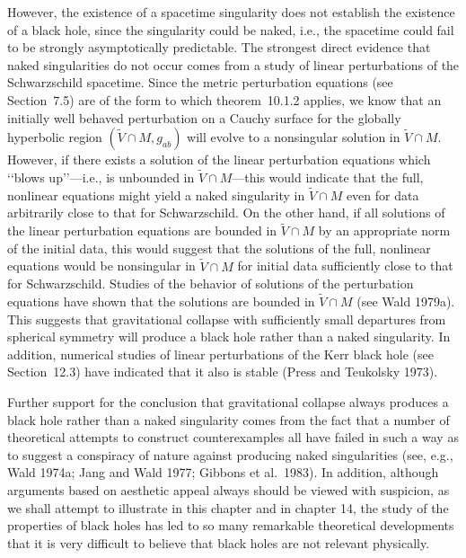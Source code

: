 However, the existence of a spacetime singularity does not establish the existence of
a black hole, since the singularity could be naked, i.e., the spacetime could fail to be
strongly asymptotically predictable. The strongest direct evidence that naked
singularities do not occur comes from a study of linear perturbations of the
Schwarzschild spacetime. Since the metric perturbation equations (see Section~7.5)
are of the form to which theorem~10.1.2 applies, we know that an initially well
behaved perturbation on a Cauchy surface for the globally hyperbolic region
\((\widetilde V\cap M,g_{ab})\) will evolve to a nonsingular solution in
\(\widetilde V\cap M\). However, if there exists a solution of the linear perturbation
equations which \lq\lq blows up\rq\rq---i.e., is unbounded in \(\widetilde V\cap M\)---this
would indicate that the full, nonlinear equations might yield a naked singularity in
\(\widetilde V\cap M\) even for data arbitrarily close to that for Schwarzschild. On
the other hand, if all solutions of the linear perturbation equations are bounded in
\(\widetilde V\cap M\) by an appropriate norm of the initial data, this would suggest
that the solutions of the full, nonlinear equations would be nonsingular in
\(\widetilde V\cap M\) for initial data sufficiently close to that for Schwarzschild.
Studies of the behavior of solutions of the perturbation equations have shown that
the solutions are bounded in \(\widetilde V\cap M\) (see Wald 1979a). This suggests
that gravitational collapse with sufficiently small departures from spherical symmetry
will produce a black hole rather than a naked singularity. In addition, numerical
studies of linear perturbations of the Kerr black hole (see Section~12.3) have
indicated that it also is stable (Press and Teukolsky 1973).

Further support for the conclusion that gravitational collapse always produces a black
hole rather than a naked singularity comes from the fact that a number of theoretical
attempts to construct counterexamples all have failed in such a way as to suggest a
conspiracy of nature against producing naked singularities (see, e.g., Wald 1974a;
Jang and Wald 1977; Gibbons et al.\ 1983). In addition, although arguments based
on aesthetic appeal always should be viewed with suspicion, as we shall attempt to
illustrate in this chapter and in chapter 14, the study of the properties of black holes
has led to so many remarkable theoretical developments that it is very difficult to
believe that black holes are not relevant physically.

